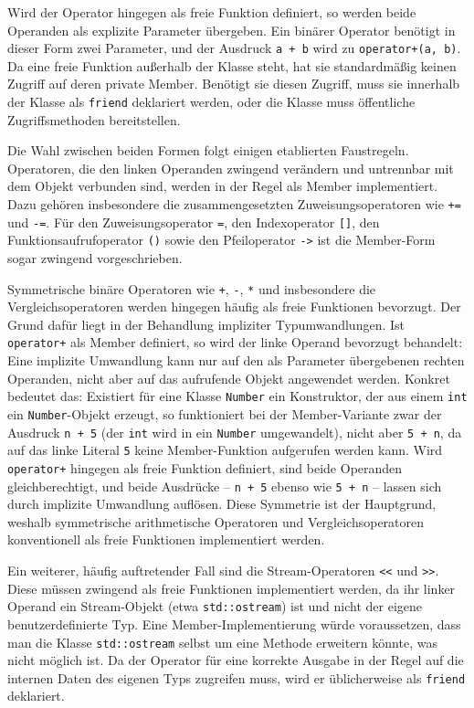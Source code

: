 \documentclass[10pt,a4paper]{article}
\begin{document}
Wird der Operator hingegen als freie Funktion definiert, so werden beide Operanden als explizite Parameter übergeben. Ein binärer Operator benötigt in dieser Form zwei Parameter, und der Ausdruck \texttt{a + b} wird zu \texttt{operator+(a, b)}. Da eine freie Funktion außerhalb der Klasse steht, hat sie standardmäßig keinen Zugriff auf deren private Member. Benötigt sie diesen Zugriff, muss sie innerhalb der Klasse als \texttt{friend} deklariert werden, oder die Klasse muss öffentliche Zugriffsmethoden bereitstellen.

Die Wahl zwischen beiden Formen folgt einigen etablierten Faustregeln. Operatoren, die den linken Operanden zwingend verändern und untrennbar mit dem Objekt verbunden sind, werden in der Regel als Member implementiert. Dazu gehören insbesondere die zusammengesetzten Zuweisungsoperatoren wie \texttt{+=} und \texttt{-=}. Für den Zuweisungsoperator \texttt{=}, den Indexoperator \texttt{[]}, den Funktionsaufrufoperator \texttt{()} sowie den Pfeiloperator \texttt{->} ist die Member-Form sogar zwingend vorgeschrieben.

Symmetrische binäre Operatoren wie \texttt{+}, \texttt{-}, \texttt{*} und insbesondere die Vergleichsoperatoren werden hingegen häufig als freie Funktionen bevorzugt. Der Grund dafür liegt in der Behandlung impliziter Typumwandlungen. Ist \texttt{operator+} als Member definiert, so wird der linke Operand bevorzugt behandelt: Eine implizite Umwandlung kann nur auf den als Parameter übergebenen rechten Operanden, nicht aber auf das aufrufende Objekt angewendet werden. Konkret bedeutet das: Existiert für eine Klasse \texttt{Number} ein Konstruktor, der aus einem \texttt{int} ein \texttt{Number}-Objekt erzeugt, so funktioniert bei der Member-Variante zwar der Ausdruck \texttt{n + 5} (der \texttt{int} wird in ein \texttt{Number} umgewandelt), nicht aber \texttt{5 + n}, da auf das linke Literal \texttt{5} keine Member-Funktion aufgerufen werden kann. Wird \texttt{operator+} hingegen als freie Funktion definiert, sind beide Operanden gleichberechtigt, und beide Ausdrücke -- \texttt{n + 5} ebenso wie \texttt{5 + n} -- lassen sich durch implizite Umwandlung auflösen. Diese Symmetrie ist der Hauptgrund, weshalb symmetrische arithmetische Operatoren und Vergleichsoperatoren konventionell als freie Funktionen implementiert werden.

Ein weiterer, häufig auftretender Fall sind die Stream-Operatoren \texttt{<<} und \texttt{>>}. Diese müssen zwingend als freie Funktionen implementiert werden, da ihr linker Operand ein Stream-Objekt (etwa \texttt{std::ostream}) ist und nicht der eigene benutzerdefinierte Typ. Eine Member-Implementierung würde voraussetzen, dass man die Klasse \texttt{std::ostream} selbst um eine Methode erweitern könnte, was nicht möglich ist. Da der Operator für eine korrekte Ausgabe in der Regel auf die internen Daten des eigenen Typs zugreifen muss, wird er üblicherweise als \texttt{friend} deklariert.
\end{document}
